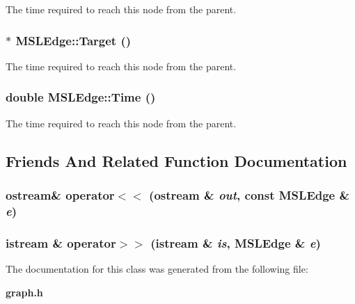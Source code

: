 The time required to reach this node from the parent.

\subsubsection{ $\ast$ MSLEdge::Target ()\hspace{0.3cm}{\tt  [inline]}}\label{class_MSLEdge_a10}


The time required to reach this node from the parent.

\subsubsection{\setlength{\rightskip}{0pt plus 5cm}double MSLEdge::Time ()\hspace{0.3cm}{\tt  [inline]}}\label{class_MSLEdge_a5}


The time required to reach this node from the parent.



\subsection{Friends And Related Function Documentation}
\subsubsection{\setlength{\rightskip}{0pt plus 5cm}ostream\& operator$<$$<$ (ostream \& {\em out}, const MSLEdge \& {\em e})\hspace{0.3cm}{\tt  [friend]}}\label{class_MSLEdge_l1}


\subsubsection{\setlength{\rightskip}{0pt plus 5cm}istream \& operator$>$$>$ (istream \& {\em is}, MSLEdge \& {\em e})\hspace{0.3cm}{\tt  [friend]}}\label{class_MSLEdge_l0}




The documentation for this class was generated from the following file:\begin{CompactItemize}
\item 
{\bf graph.h}\end{CompactItemize}
